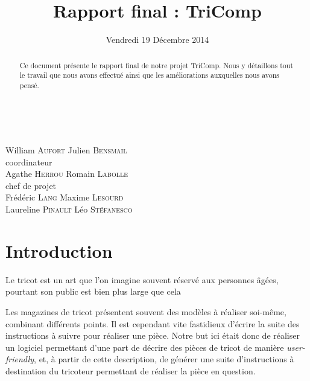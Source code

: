 \documentclass{article}
\title{Rapport final : TriComp}
\author{}
\date{Vendredi 19 Décembre 2014}
\begin{document}

\makeatletter %
  \begin{titlepage}
    \begin{center}
       {\LARGE \@title} \\
       \vspace{2cm} {\large \@date}
       \vspace{3cm}
    \end{center}
       {\large {William \textsc{Aufort} \hfill Julien
           \textsc{Bensmail} \\}
    \vspace{1cm} {\hfill coordinateur \\} {Agathe \textsc{Herrou}
      \hfill Romain \textsc{Labolle} \\}
       \vspace{1cm} {chef de projet \\}
       \vspace{1.5cm} {Frédéric \textsc{Lang} \hfill Maxime
         \textsc{Lesourd} \\} {Laureline \textsc{Pinault} \hfill Léo
         \textsc{Stéfanesco} \\}}
       \vspace{2.5cm}
    \begin{abstract}
Ce document présente le rapport final de notre projet TriComp. Nous y détaillons tout le travail 
que nous avons effectué ainsi que les améliorations auxquelles nous avons pensé.
    \end{abstract}
  \end{titlepage}
\makeatother

\newpage

\tableofcontents

\newpage

\section*{Introduction}

Le tricot est un art que l'on imagine souvent réservé aux personnes
âgées, pourtant son public est bien plus large que cela

Les magazines de tricot présentent souvent des modèles à réaliser
soi-même, combinant différents points. Il est cependant vite
fastidieux d'écrire la suite des instructions à suivre pour réaliser
une pièce. Notre but ici était donc de réaliser un logiciel permettant
d'une part de décrire des pièces de tricot de manière
\emph{user-friendly}, et, à partir de cette description, de générer
une suite d'instructions à destination du tricoteur permettant de
réaliser la pièce en question.
\end{document}
